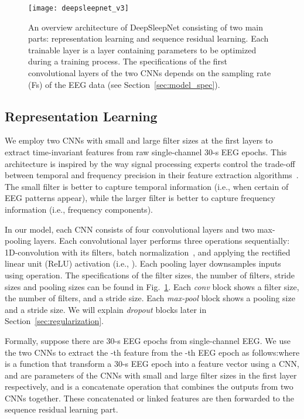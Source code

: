 \documentclass[journal,twoside]{IEEEtran}
\let\MYoriglatexcaption\caption
\renewcommand{\caption}[2][\relax]{\MYoriglatexcaption[#2]{#2}}
\begin{document}
\begin{figure}[!t]
\centering
\texttt{[image: deepsleepnet\_v3]}
\caption{An overview architecture of DeepSleepNet consisting of two main parts: representation learning and sequence residual learning. Each trainable layer is a layer containing parameters to be optimized during a training process. The specifications of the first convolutional layers of the two CNNs depends on the sampling rate (Fs) of the EEG data (see Section~\ref{sec:model_spec}).}
\label{fig:deepsleepnet}
\end{figure}




\subsection{Representation Learning} \label{sec:representation_learn}
We employ two CNNs with small and large filter sizes at the first layers to extract time-invariant features from raw single-channel 30-s EEG epochs. This architecture is inspired by the way signal processing experts control the trade-off between temporal and frequency precision in their feature extraction algorithms~\cite{cohen2014}. The small filter is better to capture temporal information (i.e., when certain of EEG patterns appear), while the larger filter is better to capture frequency information (i.e., frequency components).

In our model, each CNN consists of four convolutional layers and two max-pooling layers. Each convolutional layer performs three operations sequentially: 1D-convolution with its filters, batch normalization~\cite{ioffe2015}, and applying the rectified linear unit (ReLU) activation (i.e., ). Each pooling layer downsamples inputs using  operation. The specifications of the filter sizes, the number of filters, stride sizes and pooling sizes can be found in Fig.~\ref{fig:deepsleepnet}. Each \textit{conv} block shows a filter size, the number of filters, and a stride size. Each \textit{max-pool} block shows a pooling size and a stride size. We will explain \textit{dropout} blocks later in Section~\ref{sec:regularization}.

Formally, suppose there are  30-s EEG epochs  from single-channel EEG. We use the two CNNs to extract the -th feature  from the -th EEG epoch  as follows:where  is a function that transform a 30-s EEG epoch  into a feature vector  using a CNN,  and  are parameters of the CNNs with small and large filter sizes in the first layer respectively, and  is a concatenate operation that combines the outputs from two CNNs together. These concatenated or linked features  are then forwarded to the sequence residual learning part.
\end{document}
